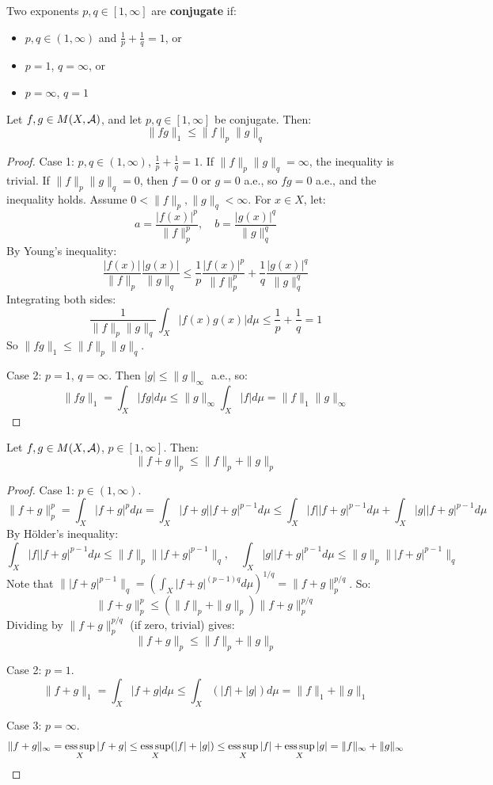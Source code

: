 \begin{definition}
Two exponents \( p, q \in [1, \infty] \) are \textbf{conjugate} if:
\begin{itemize}
    \item \( p, q \in (1, \infty) \) and \( \frac{1}{p} + \frac{1}{q} = 1 \), or
    \item \( p = 1 \), \( q = \infty \), or
    \item \( p = \infty \), \( q = 1 \)
\end{itemize}
\end{definition}

\begin{theorem}
Let \( f, g \in M(X, \mathcal{A}) \), and let \( p, q \in [1, \infty] \) be conjugate. Then:
\[
\|fg\|_1 \leq \|f\|_p \|g\|_q
\]
\end{theorem}

\begin{proof}
Case 1: \( p, q \in (1, \infty) \), \( \frac{1}{p} + \frac{1}{q} = 1 \). If \( \|f\|_p \|g\|_q = \infty \), the inequality is trivial. If \( \|f\|_p \|g\|_q = 0 \), then \( f = 0 \) or \( g = 0 \) a.e., so \( fg = 0 \) a.e., and the inequality holds. Assume \( 0 < \|f\|_p, \|g\|_q < \infty \). For \( x \in X \), let:
\[
a = \frac{|f(x)|^p}{\|f\|_p^p}, \quad b = \frac{|g(x)|^q}{\|g\|_q^q}
\]
By Young's inequality:
\[
\frac{|f(x)|}{\|f\|_p} \frac{|g(x)|}{\|g\|_q} \leq \frac{1}{p} \frac{|f(x)|^p}{\|f\|_p^p} + \frac{1}{q} \frac{|g(x)|^q}{\|g\|_q^q}
\]
Integrating both sides:
\[
\frac{1}{\|f\|_p \|g\|_q} \int_X |f(x)g(x)|  d\mu \leq \frac{1}{p} + \frac{1}{q} = 1
\]
So \( \|fg\|_1 \leq \|f\|_p \|g\|_q \).

Case 2: \( p = 1 \), \( q = \infty \). Then \( |g| \leq \|g\|_\infty \) a.e., so:
\[
\|fg\|_1 = \int_X |fg|  d\mu \leq \|g\|_\infty \int_X |f|  d\mu = \|f\|_1 \|g\|_\infty
\]
\end{proof}

\begin{theorem}
Let \( f, g \in M(X, \mathcal{A}) \), \( p \in [1, \infty] \). Then:
\[
\|f + g\|_p \leq \|f\|_p + \|g\|_p
\]
\end{theorem}

\begin{proof}
Case 1: \( p \in (1, \infty) \).
\[
\|f + g\|_p^p = \int_X |f + g|^p  d\mu = \int_X |f + g| |f + g|^{p-1}  d\mu \leq \int_X |f| |f + g|^{p-1}  d\mu + \int_X |g| |f + g|^{p-1}  d\mu
\]
By Hölder's inequality:
\[
\int_X |f| |f + g|^{p-1}  d\mu \leq \|f\|_p \| |f + g|^{p-1} \|_q, \quad \int_X |g| |f + g|^{p-1}  d\mu \leq \|g\|_p \| |f + g|^{p-1} \|_q
\]
Note that \( \| |f + g|^{p-1} \|_q = \left( \int_X |f + g|^{(p-1)q}  d\mu \right)^{1/q} = \|f + g\|_p^{p/q} \). So:
\[
\|f + g\|_p^p \leq (\|f\|_p + \|g\|_p) \|f + g\|_p^{p/q}
\]
Dividing by \( \|f + g\|_p^{p/q} \) (if zero, trivial) gives:
\[
\|f + g\|_p \leq \|f\|_p + \|g\|_p
\]

Case 2: \( p = 1 \).
\[
\|f + g\|_1 = \int_X |f + g|  d\mu \leq \int_X (|f| + |g|)  d\mu = \|f\|_1 + \|g\|_1
\]

Case 3: \( p = \infty \).
\[
\|f + g\|_\infty = \operatorname*{ess\,sup}_X |f + g| \leq \operatorname*{ess\,sup}_X (|f| + |g|) \leq \operatorname*{ess\,sup}_X |f| + \operatorname*{ess\,sup}_X |g| = \|f\|_\infty + \|g\|_\infty
\]
\end{proof}

